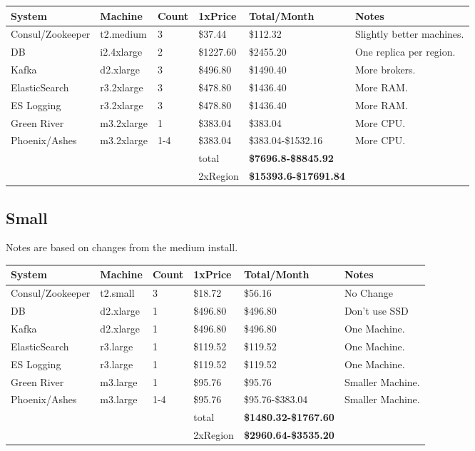 \documentclass[11pt]{article}
\begin{document}
\begin{center}
    \begin{tabular}{| l l l l | l | p{3cm} |}
        \hline
        System & Machine & Count & 1xPrice & Total/Month & Notes \\
        \hline \hline
        Consul/Zookeeper & t2.medium & 3 & \$37.44 & \$112.32 & Slightly better machines.\\ \hline
        DB & i2.4xlarge & 2 & \$1227.60 & \$2455.20 & One replica per region.\\ \hline
        Kafka & d2.xlarge & 3 & \$496.80 & \$1490.40 & More brokers.\\ \hline
        ElasticSearch & r3.2xlarge & 3 & \$478.80 & \$1436.40 & More RAM.\\ \hline
        ES Logging & r3.2xlarge & 3 & \$478.80 & \$1436.40 & More RAM.\\ \hline
        Green River & m3.2xlarge & 1 & \$383.04 & \$383.04 & More CPU.\\ \hline
        Phoenix/Ashes & m3.2xlarge & 1-4 & \$383.04 & \$383.04-\$1532.16 & More CPU.\\ \hline
        & & & total & {\bf \$7696.8-\$8845.92} & \\ \hline
        & & & 2xRegion & {\bf \$15393.6-\$17691.84} & \\ \hline
    \end{tabular}
\end{center}

\subsection{Small}

Notes are based on changes from the medium install.

\begin{center}
    \begin{tabular}{| l l l l | l | p{3cm} |}
        \hline
        System & Machine & Count & 1xPrice & Total/Month & Notes \\
        \hline \hline
        Consul/Zookeeper & t2.small & 3 & \$18.72 & \$56.16 & No Change\\ \hline
        DB & d2.xlarge & 1 & \$496.80 & \$496.80 & Don't use SSD\\ \hline
        Kafka & d2.xlarge & 1 & \$496.80 & \$496.80 & One Machine.\\ \hline
        ElasticSearch & r3.large & 1 & \$119.52 & \$119.52 & One Machine.\\ \hline
        ES Logging & r3.large & 1 & \$119.52 & \$119.52 & One Machine.\\ \hline
        Green River & m3.large & 1 & \$95.76 & \$95.76 & Smaller Machine.\\ \hline
        Phoenix/Ashes & m3.large & 1-4 & \$95.76 & \$95.76-\$383.04 & Smaller Machine.\\ \hline
        & & & total & {\bf \$1480.32-\$1767.60} & \\ \hline
        & & & 2xRegion & {\bf \$2960.64-\$3535.20} & \\ \hline
    \end{tabular}
\end{center}
\end{document}
